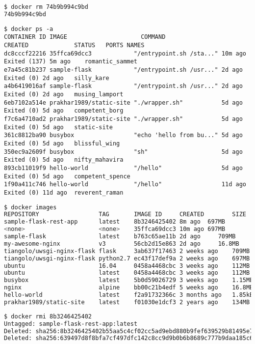\begin{lstlisting}[language=bash]
$ docker rm 74b9b994c9bd
74b9b994c9bd
\end{lstlisting}

\begin{lstlisting}[basicstyle=\tiny\ttfamily]
$ docker ps -a
CONTAINER ID IMAGE                     COMMAND                  CREATED             STATUS   PORTS NAMES
dc8cccf22216 35ffca69dcc3            "/entrypoint.sh /sta..." 10m ago Exited (137) 5m ago    romantic_sammet
e7a45c81b237 sample-flask            "/entrypoint.sh /usr..." 2d ago     Exited (0) 2d ago   silly_kare
a4b6419016af sample-flask            "/entrypoint.sh /usr..." 2d ago     Exited (0) 2d ago   musing_lamport
6eb7102a514e prakhar1989/static-site "./wrapper.sh"           5d ago     Exited (0) 5d ago   competent_borg
f7c6a4710ad2 prakhar1989/static-site "./wrapper.sh"           5d ago     Exited (0) 5d ago   static-site
361c8812ba90 busybox                 "echo 'hello from bu..." 5d ago     Exited (0) 5d ago   blissful_wing
350ec9a2609f busybox                 "sh"                     5d ago     Exited (0) 5d ago   nifty_mahavira
893cb11019f9 hello-world             "/hello"                 5d ago     Exited (0) 5d ago   competent_spence
1f90a411c746 hello-world             "/hello"                 11d ago    Exited (0) 11d ago  reverent_raman

\end{lstlisting}

\begin{lstlisting}[language=bash]
$ docker images
REPOSITORY                 TAG       IMAGE ID     CREATED        SIZE
sample-flask-rest-app      latest    8b3246425402 8m ago  697MB
<none>                     <none>    35ffca69dcc3 10m ago 697MB
sample-flask               latest    b763c65ae11b 2d ago     709MB
my-awesome-nginx           v3        56cb2d15e863 2d ago     16.8MB
tiangolo/uwsgi-nginx-flask flask     3ab637f17463 2 weeks ago    709MB
tiangolo/uwsgi-nginx-flask python2.7 ec43f17def9a 2 weeks ago    697MB
ubuntu                     16.04     0458a4468cbc 3 weeks ago    112MB
ubuntu                     latest    0458a4468cbc 3 weeks ago    112MB
busybox                    latest    5b0d59026729 3 weeks ago    1.15MB
nginx                      alpine    bb00c21b4edf 5 weeks ago    16.8MB
hello-world                latest    f2a91732366c 3 months ago   1.85kB
prakhar1989/static-site    latest    f01030e1dcf3 2 years ago    134MB
\end{lstlisting}

\begin{lstlisting}[basicstyle=\tiny\ttfamily,language=bash]
$ docker rmi 8b3246425402
Untagged: sample-flask-rest-app:latest
Deleted: sha256:8b3246425402b55aa5c4cf02cc5ad9ebd880b9fef639529b81495e778e3b3246
Deleted: sha256:639497d8f8bfa7cf497dfc142c8cc9d9b0b6b8689c777b9daa185c618b33d03c
\end{lstlisting}

